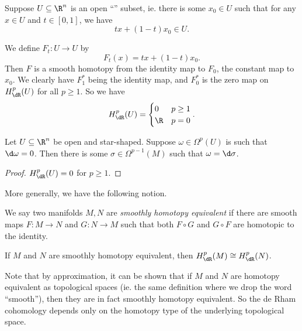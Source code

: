 \documentclass[a4paper]{article}
\begin{document}
\begin{eg}
  Suppose $U \subseteq \R^n$ is an open ``'' subset, ie. there is some $x_0 \in U$ such that for any $x \in U$ and $t \in [0, 1]$, we have
  \[
    tx + (1 - t)x_0 \in U.
  \]
  \begin{center}
  \end{center}
  We define $F_t: U \to U$ by
  \[
    F_t(x) = tx + (1 - t) x_0.
  \]
  Then $F$ is a smooth homotopy from the identity map to $F_0$, the constant map to $x_0$. We clearly have $F_1^*$ being the identity map, and $F_0^*$ is the zero map on $H^p_{\dR}(U)$ for all $p \geq 1$. So we have
  \[
    H_{\dR}^p(U) =
    \begin{cases}
      0 & p \geq 1\\
      \R & p = 0
    \end{cases}.
  \]
\end{eg}

\begin{cor}
  Let $U \subseteq \R^n$ be open and star-shaped. Suppose $\omega \in \Omega^p(U)$ is such that $\d \omega = 0$. Then there is some $\sigma \in \Omega^{p - 1}(M)$ such that $\omega = \d \sigma$.
\end{cor}

\begin{proof}
  $H^p_{\dR}(U) = 0$ for $p \geq 1$.
\end{proof}

More generally, we have the following notion.

\begin{defi}
  We say two manifolds $M, N$ are \emph{smoothly homotopy equivalent} if there are smooth maps $F: M \to N$ and $G: N \to M$ such that both $F \circ G$ and $G \circ F$ are homotopic to the identity.
\end{defi}

\begin{cor}
  If $M$ and $N$ are smoothly homotopy equivalent, then $H_{\dR}^p(M) \cong H_{\dR}^p(N)$.
\end{cor}

Note that by approximation, it can be shown that if $M$ and $N$ are homotopy equivalent as topological spaces (ie. the same definition where we drop the word ``smooth''), then they are in fact smoothly homotopy equivalent. So the de Rham cohomology depends only on the homotopy type of the underlying topological space.
\end{document}

